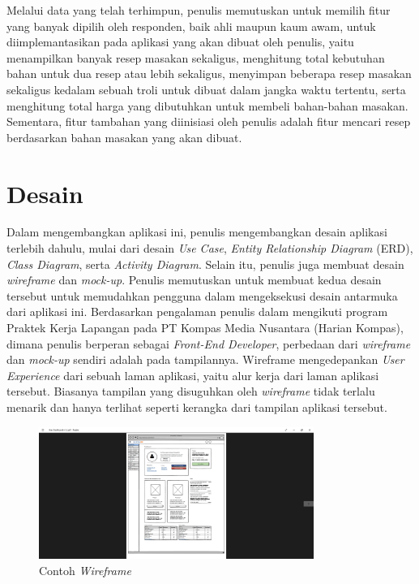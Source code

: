 	Melalui data yang telah terhimpun, penulis memutuskan untuk memilih fitur yang banyak dipilih oleh responden, baik ahli maupun kaum awam, untuk diimplemantasikan pada aplikasi yang akan dibuat oleh penulis, yaitu menampilkan banyak resep masakan sekaligus, menghitung total kebutuhan bahan untuk dua resep atau lebih sekaligus, menyimpan beberapa resep masakan sekaligus kedalam sebuah troli untuk dibuat dalam jangka waktu tertentu, serta menghitung total harga yang dibutuhkan untuk membeli bahan-bahan masakan. Sementara, fitur tambahan yang diinisiasi oleh penulis adalah fitur mencari resep berdasarkan bahan masakan yang akan dibuat.
	
\section{Desain}
	Dalam mengembangkan aplikasi ini, penulis mengembangkan desain aplikasi terlebih dahulu, mulai dari desain \emph{Use Case}, \emph{Entity Relationship Diagram} (ERD), \emph{Class Diagram}, serta \emph{Activity Diagram}. Selain itu, penulis juga membuat desain \textit{wireframe} dan \textit{mock-up}. Penulis memutuskan untuk membuat kedua desain tersebut untuk memudahkan pengguna dalam mengeksekusi desain antarmuka dari aplikasi ini. Berdasarkan pengalaman penulis dalam mengikuti program Praktek Kerja Lapangan pada PT Kompas Media Nusantara (Harian Kompas), dimana penulis berperan sebagai \textit{Front-End Developer}, perbedaan dari \textit{wireframe} dan \textit{mock-up} sendiri adalah pada tampilannya. Wireframe mengedepankan \textit{User Experience} dari sebuah laman aplikasi, yaitu alur kerja dari laman aplikasi tersebut. Biasanya tampilan yang disuguhkan oleh \textit{wireframe} tidak terlalu menarik dan hanya terlihat seperti kerangka dari tampilan aplikasi tersebut. 
	\begin{figure}[H]
		\centering
		\includegraphics[origin=c,width=0.8\textwidth]{gambar/kompas/wireframe}
		\caption{Contoh \emph{Wireframe}}
	\end{figure}
